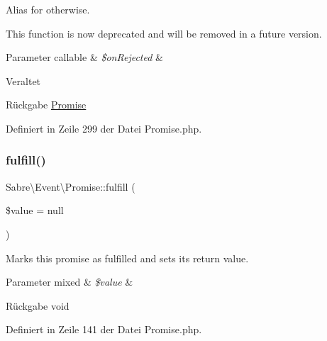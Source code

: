 Alias for \textquotesingle{}otherwise\textquotesingle{}.

This function is now deprecated and will be removed in a future version.


\begin{DoxyParams}[1]{Parameter}
callable & {\em \$on\+Rejected} & \\
\hline
\end{DoxyParams}
\begin{DoxyRefDesc}{Veraltet}
\item[\mbox{\hyperlink{deprecated__deprecated000047}{Veraltet}}]\end{DoxyRefDesc}
\begin{DoxyReturn}{Rückgabe}
\mbox{\hyperlink{class_sabre_1_1_event_1_1_promise}{Promise}} 
\end{DoxyReturn}


Definiert in Zeile 299 der Datei Promise.\+php.

\mbox{\label{class_sabre_1_1_event_1_1_promise_a846345ad77b797c51daa024d7364c7cf}} 
\subsubsection{\texorpdfstring{fulfill()}{fulfill()}}
{\footnotesize\ttfamily Sabre\textbackslash{}\+Event\textbackslash{}\+Promise\+::fulfill (\begin{DoxyParamCaption}\item[{}]{\$value = {\ttfamily null} }\end{DoxyParamCaption})}

Marks this promise as fulfilled and sets its return value.


\begin{DoxyParams}[1]{Parameter}
mixed & {\em \$value} & \\
\hline
\end{DoxyParams}
\begin{DoxyReturn}{Rückgabe}
void 
\end{DoxyReturn}


Definiert in Zeile 141 der Datei Promise.\+php.

\mbox{\label{class_sabre_1_1_event_1_1_promise_aa45393483cc9bcc0feefcc53f0dba76c}} 
